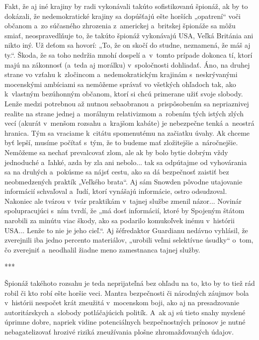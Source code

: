 \documentclass{article}
\begin{document}
Fakt, že aj iné krajiny by radi vykonávali takúto sofistikovanú špionáž, ak by to dokázali, že nedemokratické krajiny sa dopúšťajú ešte horších „opatrení“ voči občanom a~zo súčasného zhrozenia z~americkej a~britskej špionáže sa môžu smiať, neospravedlňuje to, že takúto špionáž vykonávajú USA, Veľká Británia ani nikto iný. Už deťom sa hovorí: „To, že on skočí do studne, neznamená, že máš aj ty.“. Škoda, že sa toho nedržia mnohí dospelí a~v~tomto prípade dokonca tí, ktorí majú na zákonnosť (a~teda aj morálku) v~spoločnosti dohliadať. Áno, na druhej strane vo vzťahu k~zločincom a~nedemokratickým krajinám s~neskrývanými mocenskými ambíciami sa nemôžeme správať vo všetkých ohľadoch tak, ako k~vlastným bezúhonným občanom, ktorí si chcú primerane užiť svoje slobody. Lenže medzi potrebnou až nutnou sebaobranou a~prispôsobením sa nepriaznivej realite na strane jednej a~morálnym relativizmom a~robením tých istých zlých vecí (akurát v~menšom rozsahu a~krajšom kabáte) je nebezpečne tenká a~neostrá hranica. Tým sa vraciame k~citátu spomenutému na začiatku úvahy. Ak chceme byť lepší, musíme počítať s~tým, že to budeme mať zložitejšie a~náročnejšie. Nemôžeme sa nechať prevalcovať zlom, ale ak by bolo bytie dobrým vždy jednoduché a~ľahké, azda by zla ani nebolo... tak sa odpútajme od vyhovárania sa na druhých a~pokúsme sa nájsť cestu, ako sa dá bezpečnosť zaistiť bez neobmedzených praktík „Veľkého brata“. Aj sám Snowden pôvodne utajovanie informácií schvaľoval a~ľudí, ktorí vynášajú informácie, ostro odsudzoval. \cite{techsme3} Nakoniec ale tvárou v~tvár praktikám v~tajnej službe zmenil názor... Novinár spolupracujúci s~ním tvrdí, že „má dosť informácií, ktoré by Spojeným štátom narobili za minútu viac škody, ako sa podarilo komukoľvek inému v~histórii USA... Lenže to nie je jeho cieľ.“. \cite{sme3} Aj šéfredaktor Guardianu nedávno vyhlásil, že zverejnili iba jedno percento materiálov, „urobili veľmi selektívne úsudky“ o~tom, čo zverejniť a~neodhalil žiadne meno zamestnanca tajnej služby. \cite{sme2}

\begin{center}
	***
\end{center}

Špionáž takéhoto rozsahu je teda neprijateľná bez ohľadu na to, kto by to tiež rád robil či kto robí ešte horšie veci. Mantra bezpečnosti či národných záujmov bola v~histórii nespočet krát zneužitá v~mocenskom boji, ako aj na presadzovanie autoritárskych a~slobody potláčajúcich politík. A~ak aj sú tieto snahy myslené úprimne dobre, napriek vidine potenciálnych bezpečnostných prínosov je nutné nebagatelizovať hrozivé riziká zneužívania plošne zhromažďovaných údajov.
\end{document}

